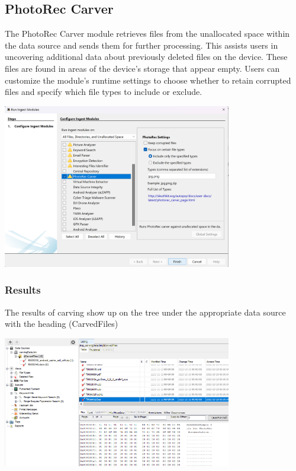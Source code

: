 \documentclass{extarticle}
\begin{document}
\subsection{PhotoRec Carver}
The PhotoRec Carver module retrieves files from the unallocated space within the data source and sends them for further processing. This assists users in uncovering additional data about previously deleted files on the device. These files are found in areas of the device's storage that appear empty. Users can customize the module's runtime settings to choose whether to retain corrupted files and specify which file types to include or exclude.
\begin{center}
    \includegraphics[width=0.75\textwidth]{3/3.11/PhotoRec Carver Settings.png}
\end{center}


\subsubsection*{Results}
The results of carving show up on the tree under the appropriate data source with the heading (CarvedFiles)
\begin{center}
    \includegraphics[width=0.75\textwidth]{3/3.11/PhotoRec Carver Results.png}
\end{center}
\end{document}
